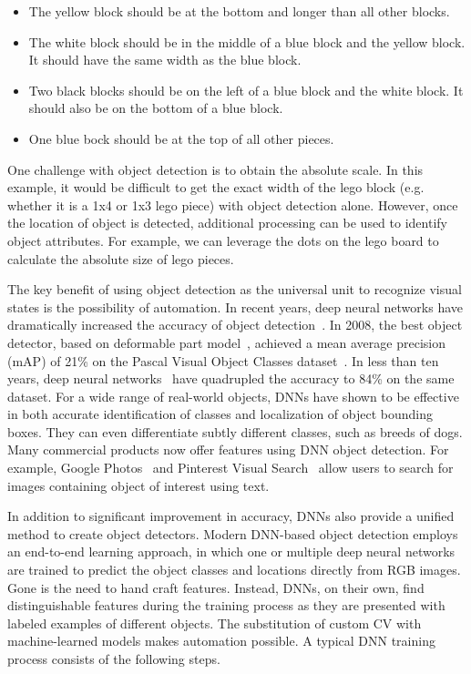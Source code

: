 \begin{itemize}
  \item The yellow block should be at the bottom and longer than all other blocks.
  \item The white block should be in the middle of a blue block and the yellow
        block. It should have the same width as the blue block.
  \item Two black blocks should be on the left of a blue block and the white
        block. It should also be on the bottom of a blue block.
  \item One blue bock should be at the top of all other pieces.
\end{itemize}

One challenge with object detection is to obtain the absolute scale. In this
example, it would be difficult to get the exact width of the lego block (e.g.
whether it is a 1x4 or 1x3 lego piece) with object detection alone. However,
once the location of object is detected, additional processing can be used to
identify object attributes. For example, we can leverage the dots
on the lego board to calculate the absolute size of lego pieces.

The key benefit of using object detection as the universal unit to recognize
visual states is the possibility of automation. In recent years, deep neural
networks have dramatically increased the accuracy of object
detection~\cite{zou2019object}. In 2008, the best object detector, based on
deformable part model~\cite{felzenszwalb2008discriminatively}, achieved a mean
average precision (mAP) of 21\% on the Pascal Visual Object Classes
dataset~\cite{everingham2010pascal}. In less than ten years, deep neural
networks~\cite{he2017mask,Ren2015,He2016,lin2017focal} have quadrupled the
accuracy to 84\% on the same dataset. For a wide range of real-world objects,
DNNs have shown to be effective in both accurate identification of classes and
localization of object bounding boxes.  They can even differentiate subtly
different classes, such as breeds of dogs. Many commercial products now offer
features using DNN object detection. For example, Google
Photos~\cite{googlePhoto} and Pinterest Visual Search~\cite{pinterest} allow
users to search for images containing object of interest using text.

In addition to significant improvement in accuracy, DNNs also provide a unified
method to create object detectors. Modern DNN-based object detection employs an
end-to-end learning approach, in which one or multiple deep neural networks are
trained to predict the object classes and locations directly from RGB images.
Gone is the need to hand craft features. Instead, DNNs, on their
own, find distinguishable features during the training process as they are
presented with labeled examples of different objects. The substitution of custom
CV with machine-learned models makes automation possible. A typical DNN training
process consists of the following steps.

